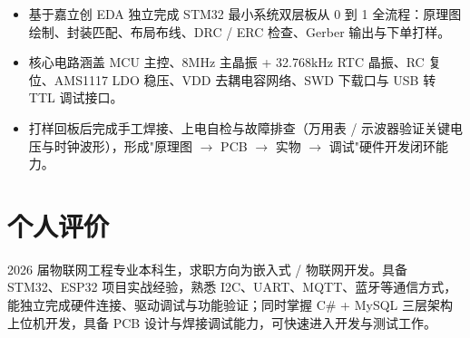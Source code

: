 \documentclass[10pt,a4paper]{article}
\begin{document}
\begin{itemize}[leftmargin=1.5em, itemsep=2pt, parsep=0pt, topsep=2pt]
    \item 基于嘉立创 EDA 独立完成 STM32 最小系统双层板从 0 到 1 全流程：原理图绘制、封装匹配、布局布线、DRC / ERC 检查、Gerber 输出与下单打样。
    \item 核心电路涵盖 MCU 主控、8MHz 主晶振 + 32.768kHz RTC 晶振、RC 复位、AMS1117 LDO 稳压、VDD 去耦电容网络、SWD 下载口与 USB 转 TTL 调试接口。
    \item 打样回板后完成手工焊接、上电自检与故障排查（万用表 / 示波器验证关键电压与时钟波形），形成"原理图 $\to$ PCB $\to$ 实物 $\to$ 调试"硬件开发闭环能力。
\end{itemize}

\vspace{0.15em}

\section{\faUser\hspace{0.4em}个人评价}

2026 届物联网工程专业本科生，求职方向为嵌入式 / 物联网开发。具备 STM32、ESP32 项目实战经验，熟悉 I2C、UART、MQTT、蓝牙等通信方式，能独立完成硬件连接、驱动调试与功能验证；同时掌握 C\# + MySQL 三层架构上位机开发，具备 PCB 设计与焊接调试能力，可快速进入开发与测试工作。
\end{document}
